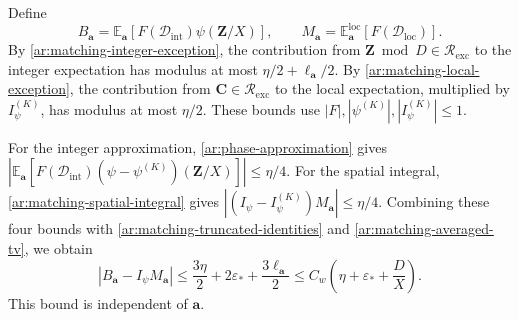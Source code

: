 \documentclass[twoside]{aomart}
\makeatletter
\theoremstyle{paperplain}
\theoremstyle{paperdefinition}
\renewenvironment{proof}[1][\proofname]{\par\pushQED{\qed}%
  \normalfont\topsep6\p@\@plus3\p@\relax\trivlist
  \item[\hskip\labelsep\itshape #1\@addpunct{.}]\ignorespaces
}{\popQED\endtrivlist\@endpefalse}
\newcommand{\E}{\mathbb E}
\numberwithin{equation}{section}
\makeatother
\begin{document}
\begin{proof}
Define
\begin{equation*}
 B_{\mathbf a}=\E_{\mathbf a}
       [F(\mathcal D_{\mathrm{int}})\psi(\mathbf Z/X)],
 \qquad
 M_{\mathbf a}=\E^{\mathrm{loc}}_{\mathbf a}
       [F(\mathcal D_{\mathrm{loc}})].
 \end{equation*}
By \eqref{ar:matching-integer-exception}, the contribution from
$\mathbf Z\bmod D\in\mathcal R_{\mathrm{exc}}$ to the integer expectation
has modulus at most $\eta/2+\ell_{\mathbf a}/2$.
By \eqref{ar:matching-local-exception}, the contribution from
$\mathbf C\in\mathcal R_{\mathrm{exc}}$ to the local expectation,
multiplied by $I_\psi^{(K)}$, has modulus at most $\eta/2$.
These bounds use $|F|,|\psi^{(K)}|,|I_\psi^{(K)}|\le1$.

For the integer approximation, \eqref{ar:phase-approximation} gives
$|\E_{\mathbf a}[F(\mathcal D_{\mathrm{int}})
 (\psi-\psi^{(K)})(\mathbf Z/X)]|\le\eta/4$.
For the spatial integral, \eqref{ar:matching-spatial-integral} gives
$|(I_\psi-I_\psi^{(K)})M_{\mathbf a}|\le\eta/4$.
Combining these four bounds with
\eqref{ar:matching-truncated-identities} and
\eqref{ar:matching-averaged-tv}, we obtain
\begin{equation}
 |B_{\mathbf a}-I_\psi M_{\mathbf a}|
 \le\frac{3\eta}{2}+2\varepsilon_*+\frac{3\ell_{\mathbf a}}2
 \le C_w\left(\eta+\varepsilon_*+\frac DX\right).
 \label{ar:matching-conditional-bound}
\end{equation}
This bound is independent of $\mathbf a$.


\end{proof}
\end{document}
